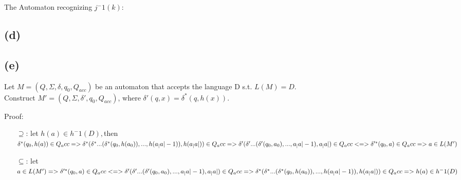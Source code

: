The Automaton recognizing $j^-1(k)$: \\


\subsection{(d)}

\subsection{(e)}

Let $M = (Q, \Sigma, \delta, q_0, Q_{acc})$ be an automaton that accepts the language D s.t. $L(M) = D$.\\
Construct $M' = (Q, \Sigma, \delta', q_0, Q_{acc})$, where $\delta'(q,x) = \delta^*(q, h(x))$.

Proof:
\begin{itemize}
    \item[$\supseteq$:] let $ h(a) \in h^-1(D), $then $ \delta^*(q_0,h(a)) \in Q_acc \\
    => \delta^*(\delta^*...(\delta^*(q_0,h(a_0)),...,h(a_|a|-1)),h(a_|a|)) \in Q_acc \\
    =>\delta'(\delta'...(\delta'(q_0,a_0),...,a_|a|-1),a_|a|) \in Q_acc \\
    <=> \delta'^*(q_0,a) \in Q_acc \\
    => a \in L(M')
    $
    \item[$\subseteq$:]  let $ a \in L(M')\\ 
     => \delta'^*(q_0,a) \in Q_acc \\
     <=> \delta'(\delta'...(\delta'(q_0,a_0),...,a_|a|-1),a_|a|) \in Q_acc \\
     => \delta^*(\delta^*...(\delta^*(q_0,h(a_0)),...,h(a_|a|-1)),h(a_|a|)) \in Q_acc \\
     => h(a) \in  h^-1(D)
     $ \qedsymbol{}

\end{itemize}



